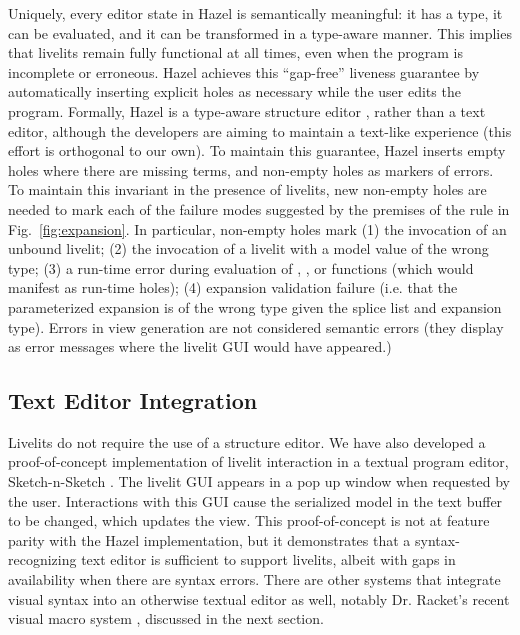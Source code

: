 Uniquely, every editor state in Hazel is 
semantically meaningful: it has a type, it can be evaluated, and it can be transformed 
in a type-aware manner. This implies that livelits remain fully functional at all times, 
even when the program is incomplete or erroneous. Hazel achieves this ``gap-free'' liveness guarantee by automatically inserting explicit holes as necessary 
while the user edits 
the program. Formally, Hazel is a type-aware structure editor \cite{Hazelnut}, rather than a text editor, 
although the developers are aiming to maintain a text-like experience (this effort is orthogonal to our own). 
To maintain this guarantee, Hazel inserts empty holes where there are missing terms, 
and non-empty holes as markers of errors. To maintain this invariant in the presence of livelits, 
new non-empty holes are needed to mark each of the failure modes suggested by the premises of the  rule in Fig.~\ref{fig:expansion}. 
In particular, non-empty holes mark (1) the invocation of an unbound livelit; (2) the invocation of a livelit 
with a model value of the wrong type; 
(3) a run-time error during evaluation of , , or  functions (which would manifest as run-time holes); (4) 
expansion validation failure (i.e. that the parameterized expansion is of the wrong type given the splice list and expansion type).  
Errors in view generation are not considered semantic errors (they display as error messages where the livelit GUI would have appeared.)




\subsection{Text Editor Integration}
Livelits do not require the use of a structure editor. 
We have also developed a 
proof-of-concept implementation of livelit interaction in a textual program editor, Sketch-n-Sketch \cite{sns-deuce}.
The livelit GUI appears in a pop up window when requested by the user. Interactions with this GUI cause the serialized model in the text buffer to be changed, which updates the view.
This proof-of-concept is not at feature parity with the Hazel  
 implementation, but it demonstrates that a syntax-recognizing text editor \cite{DBLP:journals/tosem/BallanceGV92,DBLP:conf/sde/HorganM84,interactive-visual-syntax} 
is sufficient to support livelits, albeit with gaps in availability when 
there are syntax errors.
There are other systems that integrate visual syntax into an otherwise textual editor as well, notably Dr. Racket's recent visual macro system \cite{interactive-visual-syntax}, discussed in the next section.

